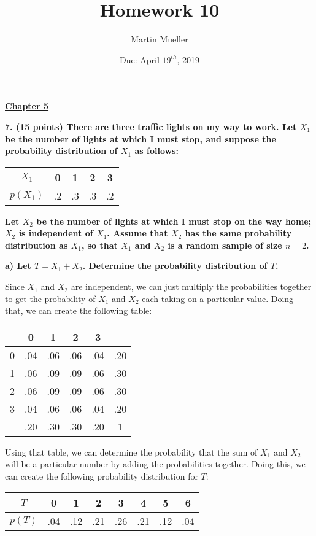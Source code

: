 \documentclass[12pt, letter]{article}
\title{Homework 10}
\author{Martin Mueller}
\date{Due: April $19^{th}$, 2019}
\begin{document}
\maketitle

\begin{center}
	\underline{\textbf{Chapter 5}}
\end{center}

\textbf{7. (15 points) There are three traffic lights on my way to work. Let $X_{1}$ be the number of lights at which I must stop, and suppose the probability distribution of $X_{1}$ as follows:}
\begin{center}
	\def\arraystretch{1.2}
	\begin{tabular}{|c|c|c|c|c|}
		\hline
		$X_{1}$ & 0 & 1 & 2 & 3 \\
		\hline
		$p(X_{1})$ & .2 & .3 & .3 & .2 \\
		\hline
	\end{tabular}
\end{center}
\textbf{Let $X_{2}$ be the number of lights at which I must stop on the way home; $X_{2}$ is independent of $X_{1}$. Assume that $X_{2}$ has the same probability distribution as $X_{1}$, so that $X_{1}$ and $X_{2}$ is a random sample of size $n = 2$.}

\qquad \textbf{a) Let $T = X_{1} + X_{2}$. Determine the probability distribution of $T$.}
\begin{center}
	Since $X_{1}$ and $X_{2}$ are independent, we can just multiply the probabilities together to get the probability of $X_{1}$ and $X_{2}$ each taking on a particular value. Doing that, we can create the following table:
	\newline
	\newline
	\def\arraystretch{1.2}
	\begin{tabular}{c|cccc|c}
		\backslashbox{$X_{2}$}{$X_{1}$} & 0 & 1 & 2 & 3 & \\
		\hline
		0 & .04 & .06 & .06 & .04 & .20 \\
		1 & .06 & .09 & .09 & .06 & .30 \\
		2 & .06 & .09 & .09 & .06 & .30 \\
		3 & .04 & .06 & .06 & .04 & .20 \\
		\hline
		& .20 & .30 & .30 & .20 & 1
	\end{tabular}
	
	\pagebreak
	
	Using that table, we can determine the probability that the sum of $X_{1}$ and $X_{2}$ will be a particular number by adding the probabilities together. Doing this, we can create the following probability distribution for $T$:
	\newline
	\newline
	\def\arraystretch{1.2}
	\begin{tabular}{|c|c|c|c|c|c|c|c|}
		\hline
		$T$ & 0 & 1 & 2 & 3 & 4 & 5 & 6 \\
		\hline
		$p(T)$ & .04 & .12 & .21 & .26 & .21 & .12 & .04 \\
		\hline
	\end{tabular}
\end{center}
\end{document}
